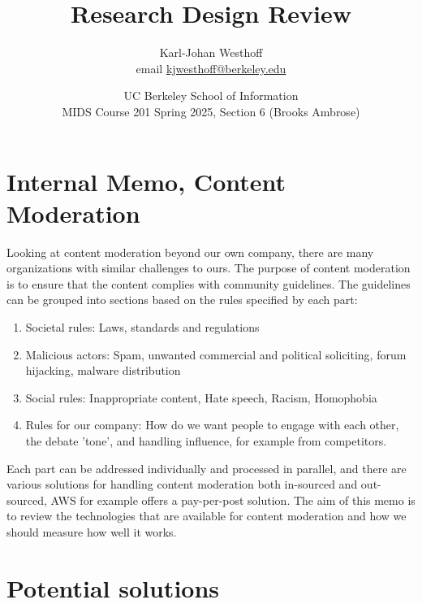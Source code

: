 \documentclass[
	letterpaper, %
	12pt, %
	unnumberedsections, %
	twoside, %
]{LTJournalArticle}
\title{Research Design Review} %
\author{
	Karl-Johan Westhoff \\
	email \href{mailto:kjwesthoff@berkeley.edu}{kjwesthoff@berkeley.edu}
}
\date{UC Berkeley School of Information \\
MIDS Course 201 Spring 2025, Section 6 (Brooks Ambrose)
}
\begin{document}
\onecolumn
\maketitle %





\section*{Internal Memo, Content Moderation}

Looking at content moderation beyond our own company, there are many organizations with similar challenges to ours. The purpose of content moderation is to ensure that the content complies with community guidelines. The guidelines can be grouped into sections based on the rules specified by each part:

\begin{enumerate}[label=(\Alph*)]
	\item Societal rules: Laws, standards and regulations
	\item Malicious actors: Spam, unwanted commercial and political soliciting, forum hijacking, malware distribution
	\item Social rules: Inappropriate content, Hate speech, Racism, Homophobia
	\item Rules for our company: How do we want people to engage with each other, the debate 'tone', and handling influence, for example from competitors.
\end{enumerate}

Each part can be addressed individually and processed in parallel, and there are various solutions for handling content moderation both in-sourced and out-sourced, AWS for example offers a pay-per-post solution\cite{AWS_contentModeration}. The aim of this memo is to review the technologies that are available for content moderation and how we should measure how well it works.


\section{Potential solutions}
\end{document}
